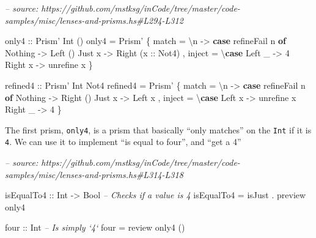 \documentclass[]{article}
\newenvironment{Shaded}{}{}
\newcommand{\CommentTok}[1]{\textcolor[rgb]{0.38,0.63,0.69}{\textit{#1}}}
\newcommand{\DataTypeTok}[1]{\textcolor[rgb]{0.56,0.13,0.00}{#1}}
\newcommand{\DecValTok}[1]{\textcolor[rgb]{0.25,0.63,0.44}{#1}}
\newcommand{\FunctionTok}[1]{\textcolor[rgb]{0.02,0.16,0.49}{#1}}
\newcommand{\KeywordTok}[1]{\textcolor[rgb]{0.00,0.44,0.13}{\textbf{#1}}}
\newcommand{\NormalTok}[1]{#1}
\newcommand{\OtherTok}[1]{\textcolor[rgb]{0.00,0.44,0.13}{#1}}
\begin{document}
\begin{Shaded}
\begin{Highlighting}[]
\CommentTok{-- source: https://github.com/mstksg/inCode/tree/master/code-samples/misc/lenses-and-prisms.hs#L294-L312}

\OtherTok{only4 ::} \DataTypeTok{Prism'} \DataTypeTok{Int}\NormalTok{ ()}
\NormalTok{only4 }\FunctionTok{=} \DataTypeTok{Prism'}
\NormalTok{    \{ match  }\FunctionTok{=}\NormalTok{ \textbackslash{}n }\OtherTok{->} \KeywordTok{case}\NormalTok{ refineFail n }\KeywordTok{of}
        \DataTypeTok{Nothing} \OtherTok{->} \DataTypeTok{Left}\NormalTok{ ()}
        \DataTypeTok{Just}\NormalTok{ x  }\OtherTok{->} \DataTypeTok{Right}\NormalTok{ (}\OtherTok{x ::} \DataTypeTok{Not4}\NormalTok{)}
\NormalTok{    , inject }\FunctionTok{=}\NormalTok{ \textbackslash{}}\KeywordTok{case}
        \DataTypeTok{Left}\NormalTok{  _ }\OtherTok{->} \DecValTok{4}
        \DataTypeTok{Right}\NormalTok{ x }\OtherTok{->}\NormalTok{ unrefine x}
\NormalTok{    \}}

\OtherTok{refined4 ::} \DataTypeTok{Prism'} \DataTypeTok{Int} \DataTypeTok{Not4}
\NormalTok{refined4 }\FunctionTok{=} \DataTypeTok{Prism'}
\NormalTok{    \{ match  }\FunctionTok{=}\NormalTok{ \textbackslash{}n }\OtherTok{->} \KeywordTok{case}\NormalTok{ refineFail n }\KeywordTok{of}
        \DataTypeTok{Nothing} \OtherTok{->} \DataTypeTok{Right}\NormalTok{ ()}
        \DataTypeTok{Just}\NormalTok{ x  }\OtherTok{->} \DataTypeTok{Left}\NormalTok{ x}
\NormalTok{    , inject }\FunctionTok{=}\NormalTok{ \textbackslash{}}\KeywordTok{case}
        \DataTypeTok{Left}\NormalTok{  x }\OtherTok{->}\NormalTok{ unrefine x}
        \DataTypeTok{Right}\NormalTok{ _ }\OtherTok{->} \DecValTok{4}
\NormalTok{    \}}
\end{Highlighting}
\end{Shaded}

The first prism, \texttt{only4}, is a prism that basically ``only matches'' on
the \texttt{Int} if it is \texttt{4}. We can use it to implement ``is equal to
four'', and ``get a 4''

\begin{Shaded}
\begin{Highlighting}[]
\CommentTok{-- source: https://github.com/mstksg/inCode/tree/master/code-samples/misc/lenses-and-prisms.hs#L314-L318}

\OtherTok{isEqualTo4 ::} \DataTypeTok{Int} \OtherTok{->} \DataTypeTok{Bool}   \CommentTok{-- Checks if a value is 4}
\NormalTok{isEqualTo4 }\FunctionTok{=}\NormalTok{ isJust }\FunctionTok{.}\NormalTok{ preview only4}

\OtherTok{four ::} \DataTypeTok{Int}     \CommentTok{-- Is simply `4`}
\NormalTok{four }\FunctionTok{=}\NormalTok{ review only4 ()}
\end{Highlighting}
\end{Shaded}
\end{document}
